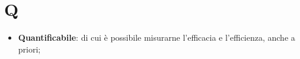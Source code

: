 %
%
%
%

\section{Q}

\begin{itemize}
	\item \textbf{Quantificabile}: di cui è possibile misurarne l'efficacia e l'efficienza, anche a priori;

\end{itemize}
